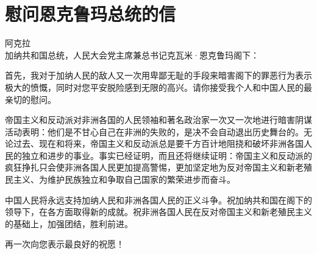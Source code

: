 \section[慰问恩克鲁玛总统的信（一九六四年一月九日）]{慰问恩克鲁玛总统的信}

{\noindent
阿克拉\\
加纳共和国总统，人民大会党主席兼总书记克瓦米·恩克鲁玛阁下：}

首先，我对于加纳人民的敌人又一次用卑鄙无耻的手段来暗害阁下的罪恶行为表示极大的愤慨，同时对您平安脱险感到无限的高兴。请你接受我个人和中国人民的最亲切的慰问。

帝国主义和反动派对非洲各国的人民领袖和著名政治家一次又一次地进行暗害阴谋活动表明：他们是不甘心自己在非洲的失败的，是决不会自动退出历史舞台的。无论过去、现在和将来，帝国主义和反动派总是要千方百计地阻挠和破坏非洲各国人民的独立和进步的事业。事实已经证明，而且还将继续证明：帝国主义和反动派的疯狂挣扎只会使非洲各国人民更加提高警惕，更加坚定地为反对帝国主义和新老殖民主义、为维护民族独立和争取自己国家的繁荣进步而奋斗。

中国人民将永远支持加纳人民和非洲各国人民的正义斗争。祝加纳共和国在阁下的领导下，在各方面取得新的成就。祝非洲各国人民在反对帝国主义和新老殖民主义的基础上，加强团结，胜利前进。

再一次向您表示最良好的祝愿！



